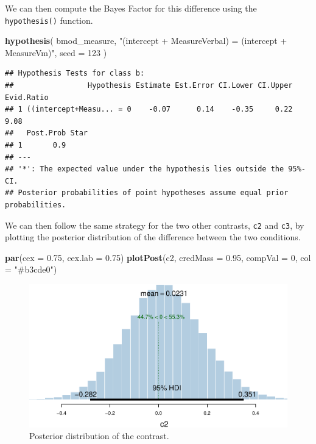 \documentclass[floatsintext,doc]{apa6}
\newenvironment{Shaded}{\begin{snugshade}}{\end{snugshade}}
\newcommand{\DataTypeTok}[1]{\textcolor[rgb]{0.13,0.29,0.53}{#1}}
\newcommand{\DecValTok}[1]{\textcolor[rgb]{0.00,0.00,0.81}{#1}}
\newcommand{\FloatTok}[1]{\textcolor[rgb]{0.00,0.00,0.81}{#1}}
\newcommand{\KeywordTok}[1]{\textcolor[rgb]{0.13,0.29,0.53}{\textbf{#1}}}
\newcommand{\NormalTok}[1]{#1}
\newcommand{\StringTok}[1]{\textcolor[rgb]{0.31,0.60,0.02}{#1}}
\begin{document}
We can then compute the Bayes Factor for this difference using the \texttt{hypothesis()} function.

\begin{Shaded}
\begin{Highlighting}[]
\KeywordTok{hypothesis}\NormalTok{(}
\NormalTok{    bmod_measure, }\StringTok{"(intercept + MeasureVerbal) = (intercept + MeasureVm)"}\NormalTok{,}
    \DataTypeTok{seed =} \DecValTok{123}
\NormalTok{    )}
\end{Highlighting}
\end{Shaded}

\begin{verbatim}
## Hypothesis Tests for class b:
##                 Hypothesis Estimate Est.Error CI.Lower CI.Upper Evid.Ratio
## 1 ((intercept+Measu... = 0    -0.07      0.14    -0.35     0.22       9.08
##   Post.Prob Star
## 1       0.9     
## ---
## '*': The expected value under the hypothesis lies outside the 95%-CI.
## Posterior probabilities of point hypotheses assume equal prior probabilities.
\end{verbatim}

We can then follow the same strategy for the two other contrasts, \texttt{c2} and \texttt{c3}, by plotting the posterior distribution of the difference between the two conditions.

\begin{Shaded}
\begin{Highlighting}[]
\KeywordTok{par}\NormalTok{(}\DataTypeTok{cex =} \FloatTok{0.75}\NormalTok{, }\DataTypeTok{cex.lab =} \FloatTok{0.75}\NormalTok{)}
\KeywordTok{plotPost}\NormalTok{(c2, }\DataTypeTok{credMass =} \FloatTok{0.95}\NormalTok{, }\DataTypeTok{compVal =} \DecValTok{0}\NormalTok{, }\DataTypeTok{col =} \StringTok{"#b3cde0"}\NormalTok{)}
\end{Highlighting}
\end{Shaded}

\begin{figure}[H]

{\centering \includegraphics[width=0.75\linewidth]{supplementary_materials_files/figure-latex/unnamed-chunk-25-1} 

}

\caption{Posterior distribution of the contrast.}\label{fig:unnamed-chunk-251}
\end{figure}
\end{document}
